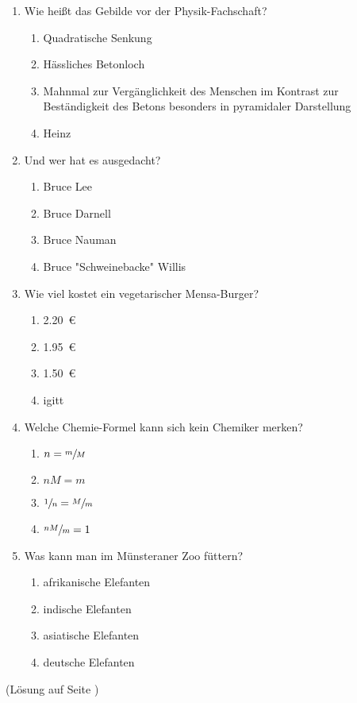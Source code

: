 \begin{multicols}{2}
\begin{enumerate}[font=\large, before=\large]
\item Wie heißt das Gebilde vor der Physik-Fachschaft?
	\begin{enumerate}[label=\alph*), before=\normalsize]
	\item Quadratische Senkung
	\item Hässliches Betonloch
	\item Mahnmal zur Vergänglichkeit des Menschen im Kontrast zur Beständigkeit des Betons besonders in pyramidaler Darstellung
	\item Heinz
\end{enumerate}
\item Und wer hat es ausgedacht?
	\begin{enumerate}[label=\alph*), before=\normalsize]
	\item Bruce Lee
	\item Bruce Darnell
	\item Bruce Nauman
	\item Bruce "Schweinebacke" Willis
	\end{enumerate}
\item Wie viel kostet ein vegetarischer Mensa-Burger?
	\begin{enumerate}[label=\alph*), before=\normalsize]
	\item \SI{2,20}{\euro}
	\item \SI{1,95}{\euro}
	\item \SI{1,50}{\euro}
	\item igitt
	\end{enumerate}
\item Welche Chemie-Formel kann sich kein Chemiker merken?
	\begin{enumerate}[label=\alph*), before=\normalsize]
	\item $n = \sfrac{m}{M}$
	\item $n M = m$
	\item $\sfrac{1}{n} = \sfrac{M}{m}$
	\item $\sfrac{n M}{m} = 1$
	\end{enumerate}
\item Was kann man im Münsteraner Zoo füttern?
	\begin{enumerate}[label=\alph*), before=\normalsize]
	\item afrikanische Elefanten
	\item indische Elefanten
	\item asiatische Elefanten
	\item deutsche Elefanten
	\end{enumerate}
\end{enumerate}

\hfill(Lösung auf Seite \pageref{rätsel_lösungen})

\begin{center}
\end{center}
\end{multicols}
